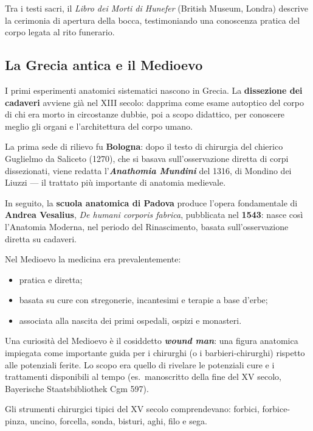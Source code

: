 \noindent Tra i testi sacri, il \textit{Libro dei Morti di Hunefer} (British Museum, Londra) descrive la cerimonia di apertura della bocca, testimoniando una conoscenza pratica del corpo legata al rito funerario.

\subsection{La Grecia antica e il Medioevo}

I primi esperimenti anatomici sistematici nascono in Grecia. La \textbf{dissezione dei cadaveri} avviene già nel XIII secolo: dapprima come esame autoptico del corpo di chi era morto in circostanze dubbie, poi a scopo didattico, per conoscere meglio gli organi e l'architettura del corpo umano.

La prima sede di rilievo fu \textbf{Bologna}: dopo il testo di chirurgia del chierico Guglielmo da Saliceto (1270), che si basava sull'osservazione diretta di corpi dissezionati, viene redatta l'\textbf{\textit{Anathomia Mundini}} del 1316, di Mondino dei Liuzzi --- il trattato più importante di anatomia medievale.

In seguito, la \textbf{scuola anatomica di Padova} produce l'opera fondamentale di \textbf{Andrea Vesalius}, \textit{De humani corporis fabrica}, pubblicata nel \textbf{1543}: nasce così l'Anatomia Moderna, nel periodo del Rinascimento, basata sull'osservazione diretta su cadaveri.

Nel Medioevo la medicina era prevalentemente:
\begin{itemize}
  \item pratica e diretta;
  \item basata su cure con stregonerie, incantesimi e terapie a base d'erbe;
  \item associata alla nascita dei primi ospedali, ospizi e monasteri.
\end{itemize}

\noindent Una curiosità del Medioevo è il cosiddetto \textbf{\textit{wound man}}: una figura anatomica impiegata come importante guida per i chirurghi (o i barbieri-chirurghi) rispetto alle potenziali ferite. Lo scopo era quello di rivelare le potenziali cure e i trattamenti disponibili al tempo (es.\ manoscritto della fine del XV secolo, Bayerische Staatsbibliothek Cgm 597).

Gli strumenti chirurgici tipici del XV secolo comprendevano: forbici, forbice-pinza, uncino, forcella, sonda, bisturi, aghi, filo e sega.

